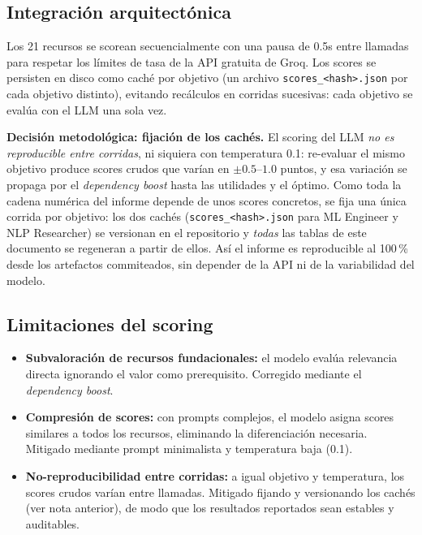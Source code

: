 \documentclass[11pt, a4paper]{article}
\begin{document}
\subsection{Integración arquitectónica}

Los 21 recursos se scorean secuencialmente con una pausa de 0.5s entre llamadas para respetar los límites de tasa de la API gratuita de Groq. Los scores se persisten en disco como caché por objetivo (un archivo \texttt{scores\_<hash>.json} por cada objetivo distinto), evitando recálculos en corridas sucesivas: cada objetivo se evalúa con el LLM una sola vez.

\begin{notebox}
\textbf{Decisión metodológica: fijación de los cachés.} El scoring del LLM
\emph{no es reproducible entre corridas}, ni siquiera con temperatura 0.1:
re-evaluar el mismo objetivo produce scores crudos que varían en
$\pm 0.5$–$1.0$ puntos, y esa variación se propaga por el \emph{dependency
boost} hasta las utilidades y el óptimo. Como toda la cadena numérica del
informe depende de unos scores concretos, se fija una única corrida por
objetivo: los dos cachés (\texttt{scores\_<hash>.json} para ML Engineer y
NLP Researcher) se versionan en el repositorio y \emph{todas} las tablas de
este documento se regeneran a partir de ellos. Así el informe es reproducible
al 100\,\% desde los artefactos commiteados, sin depender de la API ni de la
variabilidad del modelo.
\end{notebox}

\subsection{Limitaciones del scoring}

\begin{itemize}[leftmargin=1.5em]
  \item \textbf{Subvaloración de recursos fundacionales:} el modelo evalúa relevancia directa ignorando el valor como prerequisito. Corregido mediante el \emph{dependency boost}.
  \item \textbf{Compresión de scores:} con prompts complejos, el modelo asigna scores similares a todos los recursos, eliminando la diferenciación necesaria. Mitigado mediante prompt minimalista y temperatura baja (0.1).
  \item \textbf{No-reproducibilidad entre corridas:} a igual objetivo y temperatura, los scores crudos varían entre llamadas. Mitigado fijando y versionando los cachés (ver nota anterior), de modo que los resultados reportados sean estables y auditables.
\end{itemize}
\end{document}
